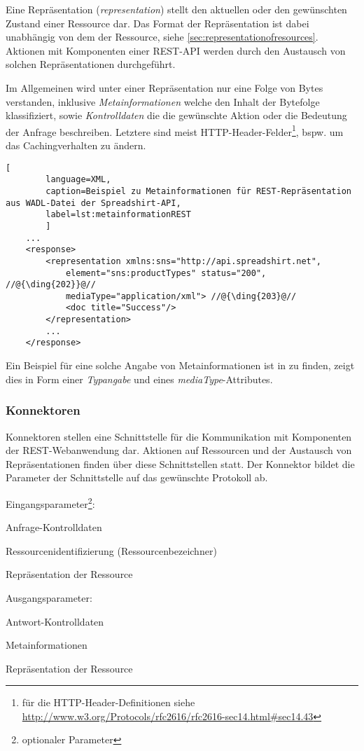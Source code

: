 Eine Repräsentation (\emph{representation}) stellt den aktuellen oder den gewünschten Zustand einer Ressource dar. Das Format der Repräsentation ist dabei unabhängig von dem der Ressource, siehe \cref{sec:representationofresources}.
Aktionen mit Komponenten einer REST-API werden durch den Austausch von solchen Repräsentationen durchgeführt.

Im Allgemeinen wird unter einer Repräsentation nur eine Folge von Bytes verstanden, inklusive \emph{Metainformationen} welche den Inhalt der Bytefolge klassifiziert, sowie \emph{Kontrolldaten} die die gewünschte Aktion oder die Bedeutung der Anfrage beschreiben. Letztere sind meist HTTP-Header-Felder\footnote{für die HTTP-Header-Definitionen siehe \url{http://www.w3.org/Protocols/rfc2616/rfc2616-sec14.html\#sec14.43}}, bspw. um das Cachingverhalten zu ändern.

\begin{minipage}{\textwidth}
    \begin{lstlisting}[
        language=XML,
        caption=Beispiel zu Metainformationen für REST-Repräsentation aus WADL-Datei der Spreadshirt-API,
        label=lst:metainformationREST
        ]
    ...
    <response>
        <representation xmlns:sns="http://api.spreadshirt.net",
            element="sns:productTypes" status="200", //@{\ding{202}}@//
            mediaType="application/xml"> //@{\ding{203}@//
            <doc title="Success"/>
        </representation>
        ...
    </response>
    \end{lstlisting}
\end{minipage}

Ein Beispiel für eine solche Angabe von Metainformationen ist in  zu finden,  zeigt dies in Form einer \emph{Typangabe} und  eines \emph{mediaType}-Attributes.

\subsubsection{Konnektoren}

Konnektoren stellen eine Schnittstelle für die Kommunikation mit Komponenten der REST-Webanwendung dar. Aktionen auf Ressourcen und der Austausch von Repräsentationen finden über diese Schnittstellen statt. Der Konnektor bildet die Parameter der Schnittstelle auf das gewünschte Protokoll ab.

Eingangsparameter\footnote{\textperiodcentered optionaler Parameter}:
\begin{compactitem}
    \item Anfrage-Kontrolldaten
    \item Ressourcenidentifizierung (Ressourcenbezeichner)
    \item[\textperiodcentered] Repräsentation der Ressource
\end{compactitem}
Ausgangsparameter:
\begin{compactitem}
    \item Antwort-Kontrolldaten
    \item[\textperiodcentered] Metainformationen
    \item[\textperiodcentered] Repräsentation der Ressource
\end{compactitem}

